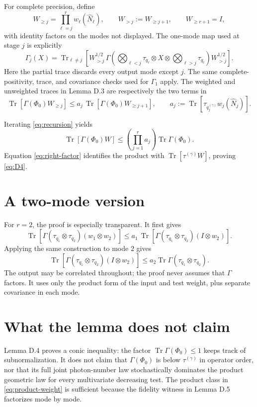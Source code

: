 \documentclass[11pt]{article}
\newcommand{\Tr}{\operatorname{Tr}}
\begin{document}
For complete precision, define
\[
  W_{\geq j}=\prod_{\ell=j}^r w_\ell(\widehat N_\ell),
  \qquad W_{>j}:=W_{\geq j+1},
  \qquad W_{\geq r+1}=I,
\]
with identity factors on the modes not displayed.  The one-mode map used at
stage $j$ is explicitly
\[
  \Gamma_j(X)=\Tr_{\ell\ne j}\!\left[
    W_{>j}^{1/2}\,
    \Gamma\!\left(
      \bigotimes_{\ell<j}\tau_{q_\ell}\otimes X\otimes
      \bigotimes_{\ell>j}\tau_{q_\ell}
    \right)
    W_{>j}^{1/2}
  \right].
\]
Here the partial trace discards every output mode except $j$.  The same
complete-positivity, trace, and covariance checks used for $\Gamma_1$ apply.
The weighted and unweighted traces in Lemma D.3 are respectively the two
terms in
\begin{equation}\label{eq:recursion}
  \Tr[\Gamma(\Phi_0)W_{\geq j}]
  \leq
  a_j\,\Tr[\Gamma(\Phi_0)W_{\geq j+1}],
  \qquad
  a_j:=\Tr[\tau_{q_j^{(\gamma)}}w_j(\widehat N_j)].
\end{equation}

Iterating \eqref{eq:recursion} yields
\[
  \Tr[\Gamma(\Phi_0)W]
  \leq
  \left(\prod_{j=1}^r a_j\right)\Tr\Gamma(\Phi_0).
\]
Equation \eqref{eq:right-factor} identifies the product with
$\Tr[\tau^{(\gamma)}W]$, proving \eqref{eq:D4}.

\section{A two-mode version}

For $r=2$, the proof is especially transparent.  It first gives
\[
  \Tr[\Gamma(\tau_{q_1}\otimes\tau_{q_2})(w_1\otimes w_2)]
  \leq a_1\,
  \Tr[\Gamma(\tau_{q_1}\otimes\tau_{q_2})(I\otimes w_2)].
\]
Applying the same construction to mode $2$ gives
\[
  \Tr[\Gamma(\tau_{q_1}\otimes\tau_{q_2})(I\otimes w_2)]
  \leq a_2\Tr\Gamma(\tau_{q_1}\otimes\tau_{q_2}).
\]
The output may be correlated throughout; the proof never assumes that
$\Gamma$ factors.  It uses only the product form of the input and test
weight, plus separate covariance in each mode.

\section{What the lemma does not claim}

Lemma D.4 proves a conic inequality: the factor
$\Tr\Gamma(\Phi_0)\leq1$ keeps track of subnormalization.  It does not claim
that $\Gamma(\Phi_0)$ is below $\tau^{(\gamma)}$ in operator order, nor that
its full joint photon-number law stochastically dominates the product
geometric law for every multivariate decreasing test.  The product class in
\eqref{eq:product-weight} is sufficient because the fidelity witness in
Lemma D.5 factorizes mode by mode.
\end{document}
